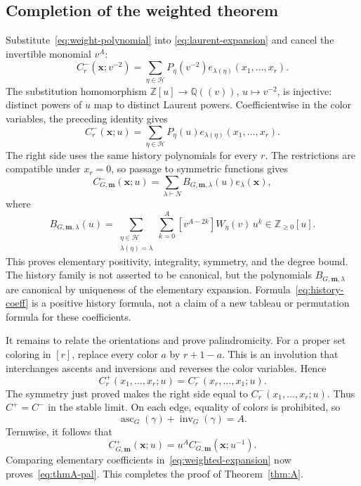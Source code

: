 \documentclass[11pt,reqno]{amsart}
\newcommand{\ZZ}{\mathbb Z}
\newcommand{\QQ}{\mathbb Q}
\newcommand{\xx}{\mathbf x}
\newcommand{\mm}{\mathbf m}
\newcommand{\HH}{\mathcal H}
\newcommand{\asc}{\operatorname{asc}}
\newcommand{\inv}{\operatorname{inv}}
\theoremstyle{definition}
\theoremstyle{remark}
\numberwithin{equation}{section}
\begin{document}
\subsection{Completion of the weighted theorem}
Substitute~\eqref{eq:weight-polynomial} into
\eqref{eq:laurent-expansion} and cancel the invertible monomial $v^A$:
\[
 C^-_r(\xx;v^{-2})
      =\sum_{\eta\in\HH}P_\eta(v^{-2})
                      e_{\lambda(\eta)}(x_1,\ldots,x_r).
\]
The substitution homomorphism $\ZZ[u]\to\QQ((v))$, $u\mapsto v^{-2}$,
is injective: distinct powers of $u$ map to distinct Laurent powers.
Coefficientwise in the color variables, the preceding identity gives
\begin{equation}\label{eq:positive-finite}
 C^-_r(\xx;u)
     =\sum_{\eta\in\HH}P_\eta(u)e_{\lambda(\eta)}(x_1,\ldots,x_r).
\end{equation}
The right side uses the same history polynomials for every $r$.
The restrictions are compatible under $x_r=0$, so passage to symmetric
functions gives
\begin{equation}\label{eq:weighted-expansion}
 C^-_{G,\mm}(\xx;u)
   =\sum_{\lambda\vdash N}B_{G,\mm,\lambda}(u)e_\lambda(\xx),
\end{equation}
where
\begin{equation}\label{eq:history-coeff}
 B_{G,\mm,\lambda}(u)
  =\sum_{\substack{\eta\in\HH\\\lambda(\eta)=\lambda}}
      \sum_{k=0}^A[v^{A-2k}]W_\eta(v)\,u^k
      \in\mathbb Z_{\geq0}[u].
\end{equation}
This proves elementary positivity, integrality, symmetry, and the degree
bound.  The history family is not asserted to be canonical, but the
polynomials $B_{G,\mm,\lambda}$ are canonical by uniqueness of the
elementary expansion.  Formula~\eqref{eq:history-coeff} is a positive
history formula, not a claim of a new tableau or permutation formula
for these coefficients.

It remains to relate the orientations and prove palindromicity.
For a proper set coloring in $[r]$, replace every color $a$ by $r+1-a$.
This is an involution that interchanges ascents and inversions and
reverses the color variables.  Hence
\[
 C^+_r(x_1,\ldots,x_r;u)=C^-_r(x_r,\ldots,x_1;u).
\]
The symmetry just proved makes the right side equal to
$C^-_r(x_1,\ldots,x_r;u)$.  Thus $C^+=C^-$ in the stable limit.
On each edge, equality of colors is prohibited, so
\begin{equation}\label{eq:asc-inv}
 \asc_G(\gamma)+\inv_G(\gamma)=A.
\end{equation}
Termwise, it follows that
\[
 C^+_{G,\mm}(\xx;u)=u^A C^-_{G,\mm}(\xx;u^{-1}).
\]
Comparing elementary coefficients in~\eqref{eq:weighted-expansion}
now proves~\eqref{eq:thmA-pal}.  This completes the proof of
Theorem~\ref{thm:A}.
\end{document}
